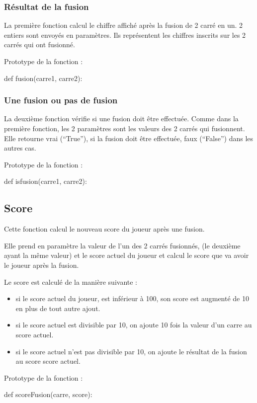 \subsubsection{Résultat de la fusion}
La première fonction calcul le chiffre affiché après la fusion de  2 carré en un.
2 entiers sont envoyés en paramètres. Ils représentent les chiffres inscrits sur les 2 carrés qui ont fusionné. 

Prototype de la fonction :
\begin{pythonCode}
def fusion(carre1, carre2):
\end{pythonCode}


\subsubsection{Une fusion ou pas de fusion}
La deuxième fonction vérifie si une fusion doit être effectuée. 
Comme dans la première fonction, les 2 paramètres sont les valeurs des 2 carrés qui fusionnent. 
Elle retourne vrai (“True”), si la fusion doit être effectuée, faux (“False”) dans les autres cas.


Prototype de la fonction :
\begin{pythonCode}
def isfusion(carre1, carre2):
\end{pythonCode}

\pagebreak

\subsection{Score}
Cette fonction calcul le nouveau score du joueur après une fusion.

Elle prend en paramètre la valeur de l'un des 2 carrés fusionnés, (le deuxième ayant la même valeur) et le score actuel du joueur et calcul le score que va avoir le joueur après la fusion.

Le score est calculé de la manière suivante :
\begin{itemize}
\item si le score actuel du joueur, est inférieur à 100, son score est augmenté de 10 en plus de tout autre ajout.
\item si le score actuel est divisible par 10, on ajoute 10 fois la valeur d'un carre au score actuel.
\item si le score actuel n'est pas divisible par 10, on ajoute le résultat de la fusion au score score actuel.
\end{itemize}
Prototype de la fonction :
\begin{pythonCode}
	def scoreFusion(carre, score):
\end{pythonCode}




